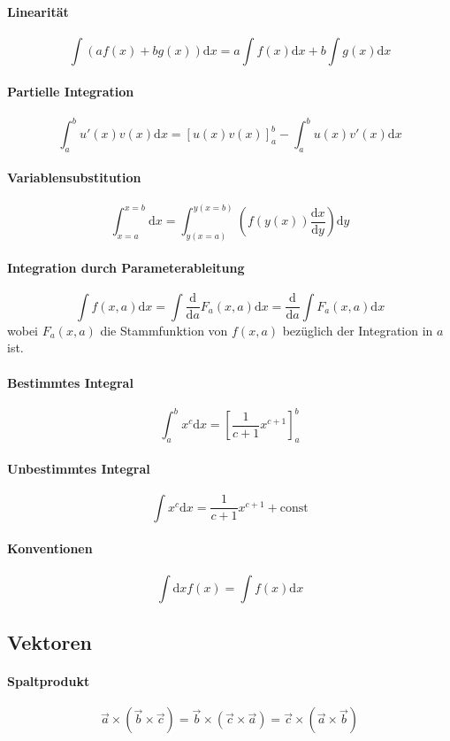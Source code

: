\documentclass[oneside]{book}
\theoremstyle{definition}
\renewcommand{\d}{\mathrm d}
\newcommand{\dd}[1]{\frac{\d}{\d #1}}
\begin{document}
\paragraph{Linearität}
$$ \int (a f(x) + b g(x)) \d x = a \int f(x) \d x + b \int g(x) \d x$$

\paragraph{Partielle Integration}
$$\int_a^b u'(x)v(x) \d x = [u(x) v(x)]_a^b - \int_a^b u(x) v'(x) \d x$$

\paragraph{Variablensubstitution}
$$\int_{x = a}^{x = b} \d x = \int_{y(x = a)}^{y(x = b)} ( f(y(x))\frac{\d x}{\d y} ) \d y$$

\paragraph{Integration durch Parameterableitung}
$$\int f(x, a) \d x = \int \dd a F_a(x,a) \d x = \dd a \int F_a(x,a) \d x$$
wobei $F_a(x,a)$ die Stammfunktion von $f(x,a)$ bezüglich der Integration in $a$ ist.

\paragraph{Bestimmtes Integral}
$$\int_a^b x^c \d x = [ \frac1{c + 1} x^{c+1}]_a^b$$

\paragraph{Unbestimmtes Integral}
$$\int x^c \d x = \frac1{c+1} x^{c+1} + \mathrm{const}$$

\paragraph{Konventionen}
$$\int \d x f(x) = \int f(x) \d x$$

\subsection{Vektoren}
\paragraph{Spaltprodukt}
$$\vec a \times (\vec b \times \vec c) = \vec b \times (\vec c \times \vec a) = \vec c \times (\vec a \times \vec b)$$
\end{document}
